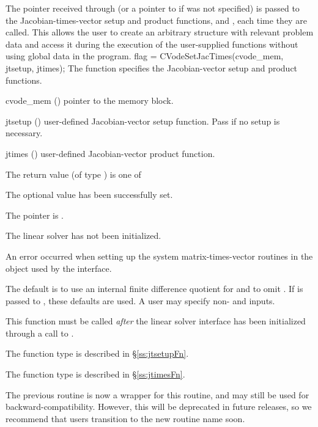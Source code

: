 The pointer  received through  (or
a pointer to  if  was not specified)
is passed to the Jacobian-times-vector setup and product functions,  and
, each time they are called.  This allows the user to
create an arbitrary structure with relevant problem data and access it
during the execution of the user-supplied functions
without using global data in the program.
{
  flag = CVodeSetJacTimes(cvode\_mem, jtsetup, jtimes);
}
{
  The function  specifies the Jacobian-vector
  setup and product functions.
}
{
  \begin{args}
  \item[cvode\_mem] ()
    pointer to the {\cvode} memory block.
  \item[jtsetup] ()
    user-defined Jacobian-vector setup function.
    Pass  if no setup is necessary.
  \item[jtimes] ()
    user-defined Jacobian-vector product function.
  \end{args}
}
{
  The return value  (of type ) is one of
  \begin{args}
  \item[\Id{CVLS\_SUCCESS}]
    The optional value has been successfully set.
  \item[\Id{CVLS\_MEM\_NULL}]
    The  pointer is .
  \item[\Id{CVLS\_LMEM\_NULL}]
    The {\cvls} linear solver has not been initialized.
  \item[\Id{CVLS\_SUNLS\_FAIL}]
    An error occurred when setting up the system matrix-times-vector
    routines in the {\sunlinsol} object used by the {\cvls}
    interface.
  \end{args}
}
{
  The default is to use an internal finite difference quotient for
   and to omit .  If  is passed to
  , these defaults are used.  A user may specify
  non-  and   inputs.

  This function must be called \emph{after} the {\cvls} linear solver
  interface has been initialized through a call to
  .

  The function type  is described in \S\ref{ss:jtsetupFn}.

  The function type  is described in \S\ref{ss:jtimesFn}.

  The previous routine  is now a wrapper for
  this routine, and may still be used for backward-compatibility.
  However, this will be deprecated in future releases, so we recommend
  that users transition to the new routine name soon.
}
